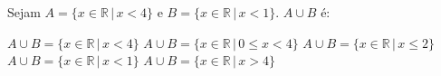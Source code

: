 Sejam $A=\{ x\in\mathbb{R}\,|\,x<4 \}$ e $B=\{ x\in \mathbb{R}\,|\,x<1 \}$. $A\cup B$ é:

$A\cup B=\{ x\in\mathbb{R}\,|\,x<4 \}$
$A\cup B=\{ x\in\mathbb{R}\,|\,0\leq x < 4\}$
$A\cup B=\{ x\in\mathbb{R}\,|\,x\leq 2 \}$
$A\cup B=\{ x\in\mathbb{R}\,|\,x<1 \}$
$A\cup B=\{ x\in\mathbb{R}\,|\,x>4 \}$



